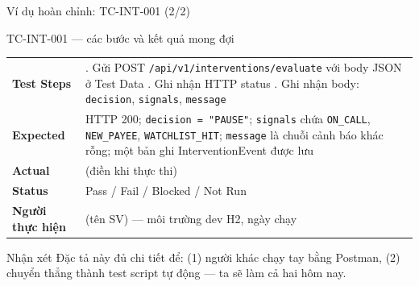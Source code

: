 \documentclass[aspectratio=169,12pt]{beamer}
\begin{document}
\begin{frame}[shrink=8]{Ví dụ hoàn chỉnh: TC-INT-001 (2/2)}
  \begin{exampleblock}{TC-INT-001 --- các bước và kết quả mong đợi}
    \small
    \renewcommand{\arraystretch}{1.02}
    \begin{tabular}{>{\raggedright\arraybackslash}p{2.9cm}>{\raggedright\arraybackslash}p{8.6cm}}
      \textbf{Test Steps}  & 1. Gửi POST \texttt{/api/v1/\allowbreak interventions/\allowbreak evaluate}
                             với body JSON ở Test Data \newline
                             2. Ghi nhận HTTP status \newline
                             3. Ghi nhận body: \texttt{decision},
                             \texttt{signals}, \texttt{message} \\
      \textbf{Expected}    & HTTP 200; \texttt{decision = "PAUSE"};
                             \texttt{signals} chứa \texttt{ON\_CALL},
                             \texttt{NEW\_PAYEE}, \texttt{WATCHLIST\_HIT};
                             \texttt{message} là chuỗi cảnh báo khác rỗng;
                             một bản ghi InterventionEvent được lưu \\
      \textbf{Actual}      & (điền khi thực thi) \\
      \textbf{Status}      & Pass / Fail / Blocked / Not Run \\
      \textbf{Người thực hiện} & (tên SV) --- môi trường dev H2, ngày chạy \\
    \end{tabular}
    \renewcommand{\arraystretch}{1}
  \end{exampleblock}

  \begin{block}{Nhận xét}
    Đặc tả này đủ chi tiết để: (1) người khác chạy tay bằng Postman,
    (2) chuyển thẳng thành test script tự động --- ta sẽ làm cả hai hôm nay.
  \end{block}
\end{frame}
\end{document}

